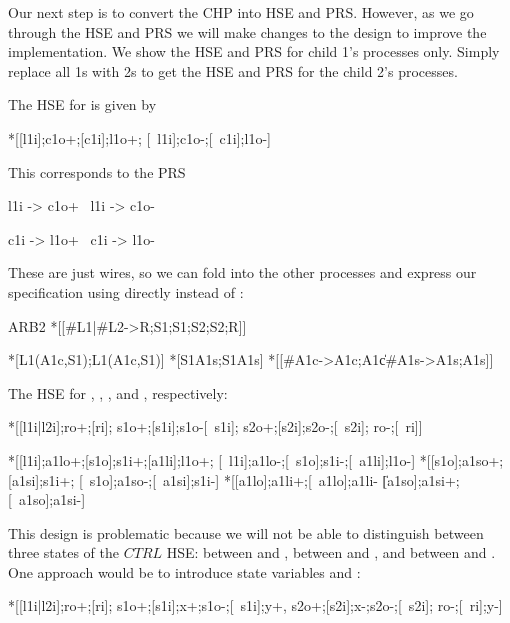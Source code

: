 \documentclass[aer.tex]{subfiles}
\begin{document}
Our next step is to convert the CHP into HSE and PRS.
However, as we go through the HSE and PRS we will make changes
to the design to improve the implementation.
We show the HSE and PRS for child 1's processes only. 
Simply replace all 1s with 2s to get the HSE and PRS for the child 2's processes.

\noindent The HSE for  is given by

\begin{hse}
  *[[l1i];c1o+;[c1i];l1o+;
    [~l1i];c1o-;[~c1i];l1o-]
\end{hse}

\noindent This corresponds to the PRS 

\begin{prs2}
l1i -> c1o+
~l1i -> c1o-

c1i -> l1o+
~c1i -> l1o-
\end{prs2}

\noindent These are just wires, so we can fold  into the other processes
and express our specification using  directly instead of :

\begin{csp}
ARB2\equiv
  *[[#{L1}|#{L2}->R;S1;S1;S2;S2;R]]

  *[L1\star(A1c,S1);L1\star(A1c,S1)]
  *[S1\star\!A1s;S1\star\!A1s]
  *[[#{A1c}->A1c;A1c\|#{A1s}->A1s;A1s]]
\end{csp}

\noindent The HSE for , , , and , respectively:

\begin{hse}
  *[[l1i|l2i];ro+;[ri];
    s1o+;[s1i];s1o-[~s1i];
    s2o+;[s2i];s2o-;[~s2i];
    ro-;[~ri]]
    
  *[[l1i];a1lo+;[s1o];s1i+;[a1li];l1o+;
    [~l1i];a1lo-;[~s1o];s1i-;[~a1li];l1o-]
  *[[s1o];a1so+;[a1si];s1i+;
    [~s1o];a1so-;[~a1si];s1i-]
  *[[a1lo];a1li+;[~a1lo];a1li-
   \|[a1so];a1si+;[~a1so];a1si-]
\end{hse}

\noindent This design is problematic because 
we will not be able to distinguish between three states of the $CTRL$ HSE: 
between \code{[ri]} and ,
between \code{[$\neg$s1i]} and , and 
between \code{[$\neg$s2i]} and . 
One approach would be to introduce state variables  and :

\begin{hse}
  *[[l1i|l2i];ro+;[ri];
    s1o+;[s1i];x+;s1o-;[~s1i];y+,
    s2o+;[s2i];x-;s2o-;[~s2i];
    ro-;[~ri];y-]
\end{hse}
\end{document}
